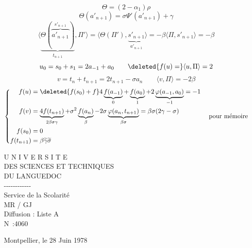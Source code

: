 \[
\Theta=(2-\alpha_1)\rho
\]
\deleted{\(\unsure{\Theta}\)}
\[
\Theta(a'_{n+1})=\sigma\Psi'(a'_{n+1})+\gamma
\]
\[
\langle\underbrace{\Theta(\overbrace{a'_{n+1}}^{s'_{n+1}})}_{t_{n+1}},\Pi'\rangle
=\langle\Theta(\Pi'),\underset{a'_{n+1}}{\underbrace{s'_{n+1}}}\rangle
=-\beta\langle\Pi,s'_{n+1}\rangle=-\beta
\]
\[
u_0=s_0+s_1=2a_{-1}+a_0
\qquad\deleted{f(u)=}\langle u,\Pi\rangle=2
\]
\[
v=t_n+t_{n+1}=2t_{n+1}-\sigma a_n
\qquad\langle v,\Pi\rangle=-2\beta
\]
\[
\left\{\begin{aligned}
f(u)&=\deleted{f(s_0)+f}
4\underbrace{f(a_{-1})}_0+\underbrace{f(a_0)}_1+
2\underbrace{\varphi(a_{-1},a_0)}_{-1}=-1\\
f(v)&=\underbrace{4f(t_{n+1})}_{2\beta\sigma\gamma}
+\sigma^2\underbrace{f(a_n)}_\beta
-2\sigma\underbrace{\varphi(a_n,t_{n+1})}_{\beta\sigma}
=\beta\sigma(2\gamma-\sigma)\\
f(s_0)&=0\\
f(t_{n+1})&=\beta\widetilde\gamma\widetilde\sigma
\end{aligned}\right.
\quad\text{pour mémoire}
\]

\begin{center}
U N I V E R S I T E\\
DES SCIENCES ET TECHNIQUES\\
DU LANGUEDOC\\
-{}-{}-{}-{}-{}-{}-{}-{}-{}-{}-{}-\\
Service de la Scolarité\\
MR / GJ\\
Diffusion : Liste A\\
N\textdegree\ :4060
\end{center}
Montpellier, le 28 Juin 1978

